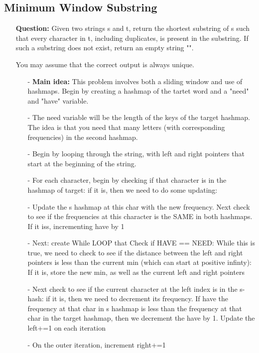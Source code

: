 \documentclass[12pt]{article}
\begin{document}
\subsection{Minimum Window Substring}
\begin{enumerate}
  \item[] \textbf{Question:} Given two strings s and t, return the shortest substring of s such that every character in t, including duplicates, is present in the substring. If such a substring does not exist, return an empty string "".

You may assume that the correct output is always unique.


    \begin{enumerate}
      \item[-] \textbf{Main idea: } This problem involves both a sliding window and use of hashmaps. Begin by creating a hashmap of the tartet word and a "need" and "have" variable.
      \item[-] The need variable will be the length of the keys of the target hashmap. The idea is that you need that many letters (with corresponding frequencies) in the second hashmap. 
      \item[-] Begin by looping through the string, with left and right pointers that start at the beginning of the string. 
      \item[-] For each character, begin by checking if that character is in the hashmap of target: if it is, then we need to do some updating: 
      \item[-] Update the s hashmap at this char with the new frequency. Next check to see if the frequencies at this character is the SAME in both hashmaps. If it iss, incrementing have by 1
      \item[-] Next: create While LOOP that Check if HAVE == NEED: While this is true, we need to check to see if the distance between the left and right pointers is less than the current min (which can start at positive infinty): If it is, store the new min, as well as the current left and right pointers
      \item[-] Next check to see if the current character at the left index is in the s-hash: if it is, then we need to decrement its frequency. If have the frequency at that char in s hashmap is less than the frequency at that char in the target hashmap, then we decrement the have by 1. Update the left+=1 on each iteration
      \item[-] On the outer iteration, increment right+=1

    \end{enumerate}
\end{enumerate}
\end{document}
